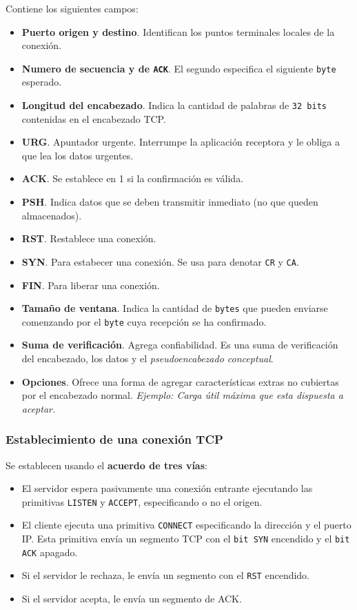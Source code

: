 \documentclass[10pt,a4paper]{article}
\begin{document}
Contiene los siguientes campos:
\begin{multicols}{2}
\begin{itemize}
\item \textbf{Puerto origen y destino}. Identifican los puntos terminales locales de
la conexión.
\item \textbf{Numero de secuencia y de \texttt{ACK}}. El segundo especifica el siguiente \texttt{byte} esperado.
\item \textbf{Longitud del encabezado}. Indica la cantidad de palabras de \texttt{32 bits} contenidas en el encabezado TCP.
\item \textbf{URG}. Apuntador urgente. Interrumpe la aplicación receptora y le obliga a que lea los datos urgentes.
\item \textbf{ACK}. Se establece en 1 si la confirmación es válida.
\item \textbf{PSH}. Indica datos que se deben transmitir inmediato (no que queden almacenados).
\item \textbf{RST}. Restablece una conexión.
\item \textbf{SYN}. Para estabecer una conexión. Se usa para denotar \texttt{CR} y \texttt{CA}.
\item \textbf{FIN}. Para liberar una conexión.
\item \textbf{Tamaño de ventana}. Indica la cantidad de \texttt{bytes} que pueden enviarse comenzando por el \texttt{byte} cuya recepción se ha confirmado.
\item \textbf{Suma de verificación}. Agrega confiabilidad. Es una suma de verificación del
encabezado, los datos y el \textit{pseudoencabezado conceptual}.
\item \textbf{Opciones}. Ofrece una forma de agregar características extras no cubiertas por el encabezado normal. \textit{Ejemplo: Carga útil máxima que esta dispuesta a aceptar.}
\end{itemize}
\end{multicols}

\subsubsection{Establecimiento de una conexión TCP}

Se establecen usando el \textbf{acuerdo de tres vías}:
\begin{itemize}
\item El servidor espera pasivamente una conexión entrante ejecutando las primitivas \texttt{LISTEN} y \texttt{ACCEPT}, especificando o no el origen.
\item El cliente ejecuta una primitiva \texttt{CONNECT} especificando la dirección y el puerto IP. Esta primitiva envía un segmento TCP con el \texttt{bit SYN} encendido y el \texttt{bit ACK} apagado.
\item Si el servidor le rechaza, le envía un segmento con el \texttt{RST} encendido.
\item Si el servidor acepta, le envía un segmento de ACK.
\end{itemize}
\end{document}
